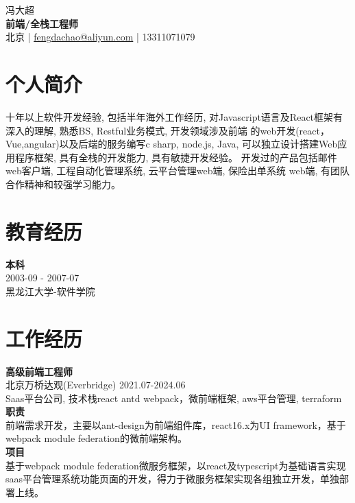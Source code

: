 \documentclass[a4paper,9pt]{extarticle}
\begin{document}
\pagestyle{empty}

\begin{center}
冯大超\\[3pt] %
\textbf{前端/全栈工程师}\\[1pt] %
北京 | \href{mailto:fengdachao@aliyun.com}{fengdachao@aliyun.com} | 13311071079 %
\end{center}

\section*{个人简介}
\noindent
\newline
十年以上软件开发经验, 包括半年海外工作经历, 对Javascript语言及React框架有深入的理解, 熟悉BS, Restful业务模式, 开发领域涉及前端 的web开发(react，Vue,angular)以及后端的服务编写c sharp, node.js, Java, 可以独立设计搭建Web应用程序框架, 具有全栈的开发能力, 具有敏捷开发经验。 开发过的产品包括邮件web客户端, 工程自动化管理系统, 云平台管理web端, 保险出单系统 web端, 有团队合作精神和较强学习能力。\\


\section*{教育经历}
\noindent
\newline
\textbf{本科} \\
2003-09 - 2007-07 \\ 
黑龙江大学-软件学院 \\


\section*{工作经历}
\noindent
\newline
\textbf{高级前端工程师} \\
北京万桥达观(Everbridge) 2021.07-2024.06 \\
Saas平台公司, 技术栈react antd webpack，微前端框架, aws平台管理, terraform \\
\textbf{职责} \\
前端需求开发，主要以ant-design为前端组件库，react16.x为UI framework，基于webpack module federation的微前端架构。 \\
\textbf{项目} \\
基于webpack module federation微服务框架，以react及typescript为基础语言实现saas平台管理系统功能页面的开发，得力于微服务框架实现各组独立开发，单独部署上线。\\
\end{document}
